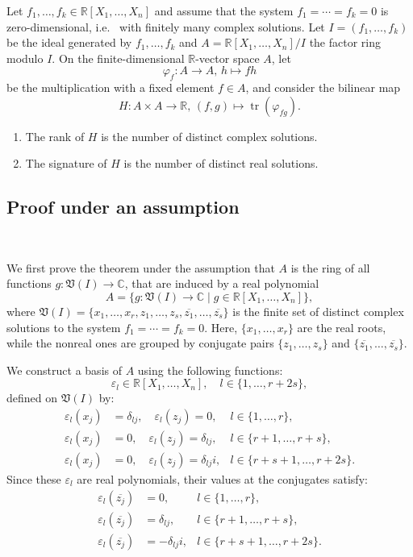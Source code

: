 \documentclass{amsart}
\begin{document}
\begin{theorem}
Let $f_1, \ldots, f_k \in \mathbb{R}[X_1, \ldots, X_n]$ and assume that the system $f_1 = \cdots = f_k = 0$ is zero-dimensional, i.e.~ with finitely many complex solutions. Let $I = (f_1, \ldots, f_k)$ be the ideal generated by $f_1, \ldots, f_k$ and $A = \mathbb{R}[X_1, \ldots, X_n]/I$ the factor ring modulo $I$. On the finite-dimensional $\mathbb{R}$-vector space $A$, let
\[
\varphi_f : A \to A, \, h \mapsto fh
\]
be the multiplication with a fixed element $f \in A$, and consider the bilinear map
\[
H : A \times A \to \mathbb{R}, \, (f, g) \mapsto \operatorname{tr}(\varphi_{fg}).
\]
\begin{enumerate}
    \item The rank of $H$ is the number of distinct complex solutions.
    \item The signature of $H$ is the number of distinct real solutions.
\end{enumerate}
\end{theorem}

\vspace{1em}

\subsection{Proof under an assumption}~

We first prove the theorem under the assumption that $A$ is the ring of all functions $g : \mathfrak{V}(I) \to \mathbb{C}$, that are induced by a real polynomial
\[
A = \{g : \mathfrak{V}(I) \to \mathbb{C} \mid g \in \mathbb{R}[X_1, \ldots, X_n] \},
\]
where $\mathfrak{V}(I) = \{x_1, \ldots, x_r, z_1, \ldots, z_s, \overline{z_1}, \ldots, \overline{z_s} \}$ is the finite set of distinct complex solutions to the system $f_1 = \cdots = f_k = 0$. Here, $\{x_1, \ldots, x_r\}$ are the real roots, while the nonreal ones are grouped by conjugate pairs $\{z_1, \ldots, z_s\}$ and $\{\overline{z_1}, \ldots, \overline{z_s}\}$. 

We construct a basis of $A$ using the following functions:
\[
\varepsilon_l \in \mathbb{R}[X_1, \ldots, X_n], \quad l \in \{1, \ldots, r+2s\},
\]
defined on $\mathfrak{V}(I)$ by:
\begin{align*}
    \varepsilon_l(x_j) &= \delta_{lj},\quad \varepsilon_l(z_j) = 0, & l \in \{1, \ldots, r\}, \\
    \varepsilon_l(x_j) &= 0,\quad \varepsilon_l(z_j) = \delta_{l j}, & l \in \{r+1, \ldots, r+s\}, \\
    \varepsilon_l(x_j) &= 0,\quad \varepsilon_l(z_j) = \delta_{l j} i, & l \in \{r+s+1, \ldots, r+2s\}.
\end{align*}
Since these $\varepsilon_l$ are real polynomials, their values at the conjugates satisfy:
\begin{align*}
    \varepsilon_l(\overline{z_j}) &= 0, & l \in \{1, \ldots, r\}, \\
    \varepsilon_l(\overline{z_j}) &= \delta_{l j}, & l \in \{r+1, \ldots, r+s\}, \\
    \varepsilon_l(\overline{z_j}) &= -\delta_{l j} i, & l \in \{r+s+1, \ldots, r+2s\}.
\end{align*}
\end{document}

